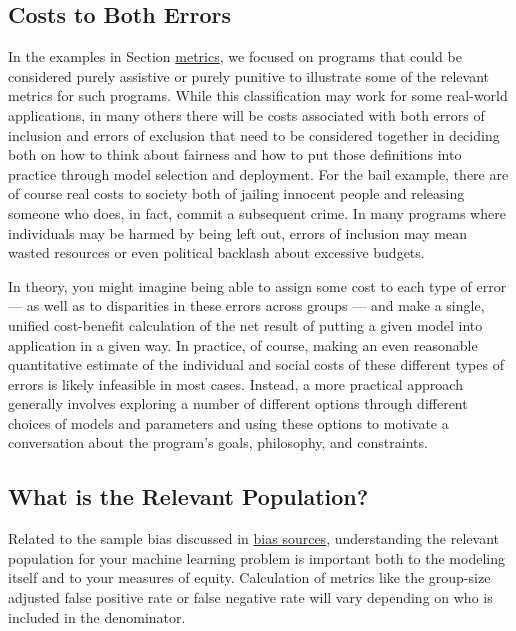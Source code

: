 \documentclass[]{krantz}
\begin{document}
\subsection{Costs to Both Errors}\label{costs-to-both-errors}

In the examples in Section \protect\hyperlink{sec:metrics}{metrics}, we
focused on programs that could be considered purely assistive or purely
punitive to illustrate some of the relevant metrics for such programs.
While this classification may work for some real-world applications, in
many others there will be costs associated with both errors of inclusion
and errors of exclusion that need to be considered together in deciding
both on how to think about fairness and how to put those definitions
into practice through model selection and deployment. For the bail
example, there are of course real costs to society both of jailing
innocent people and releasing someone who does, in fact, commit a
subsequent crime. In many programs where individuals may be harmed by
being left out, errors of inclusion may mean wasted resources or even
political backlash about excessive budgets.

In theory, you might imagine being able to assign some cost to each type
of error --- as well as to disparities in these errors across groups ---
and make a single, unified cost-benefit calculation of the net result of
putting a given model into application in a given way. In practice, of
course, making an even reasonable quantitative estimate of the
individual and social costs of these different types of errors is likely
infeasible in most cases. Instead, a more practical approach generally
involves exploring a number of different options through different
choices of models and parameters and using these options to motivate a
conversation about the program's goals, philosophy, and constraints.

\subsection{What is the Relevant
Population?}\label{what-is-the-relevant-population}

Related to the sample bias discussed in
\protect\hyperlink{sec:biassources}{bias sources}, understanding the
relevant population for your machine learning problem is important both
to the modeling itself and to your measures of equity. Calculation of
metrics like the group-size adjusted false positive rate or false
negative rate will vary depending on who is included in the denominator.
\end{document}
